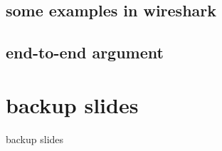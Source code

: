 \subsection{some examples in wireshark}




\subsection{end-to-end argument}




\section{backup slides}
\begin{frame}{backup slides}
\end{frame}


